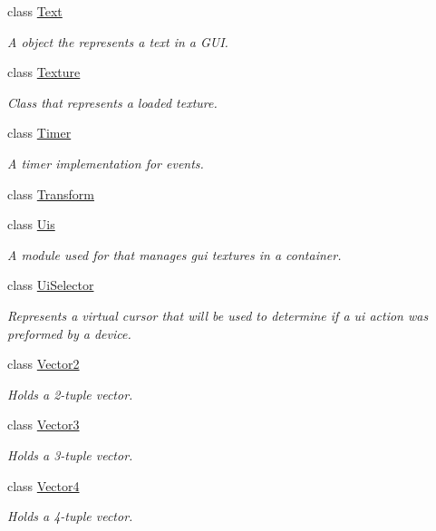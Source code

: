 \begin{DoxyCompactItemize}
class \hyperlink{class_flounder_1_1_text}{Text}
\begin{DoxyCompactList}\small\item\em A object the represents a text in a G\+UI. \end{DoxyCompactList}\item 
class \hyperlink{class_flounder_1_1_texture}{Texture}
\begin{DoxyCompactList}\small\item\em Class that represents a loaded texture. \end{DoxyCompactList}\item 
class \hyperlink{class_flounder_1_1_timer}{Timer}
\begin{DoxyCompactList}\small\item\em A timer implementation for events. \end{DoxyCompactList}\item 
class \hyperlink{class_flounder_1_1_transform}{Transform}
\item 
class \hyperlink{class_flounder_1_1_uis}{Uis}
\begin{DoxyCompactList}\small\item\em A module used for that manages gui textures in a container. \end{DoxyCompactList}\item 
class \hyperlink{class_flounder_1_1_ui_selector}{Ui\+Selector}
\begin{DoxyCompactList}\small\item\em Represents a virtual cursor that will be used to determine if a ui action was preformed by a device. \end{DoxyCompactList}\item 
class \hyperlink{class_flounder_1_1_vector2}{Vector2}
\begin{DoxyCompactList}\small\item\em Holds a 2-\/tuple vector. \end{DoxyCompactList}\item 
class \hyperlink{class_flounder_1_1_vector3}{Vector3}
\begin{DoxyCompactList}\small\item\em Holds a 3-\/tuple vector. \end{DoxyCompactList}\item 
class \hyperlink{class_flounder_1_1_vector4}{Vector4}
\begin{DoxyCompactList}\small\item\em Holds a 4-\/tuple vector. \end{DoxyCompactList}\item 

\end{DoxyCompactItemize}
